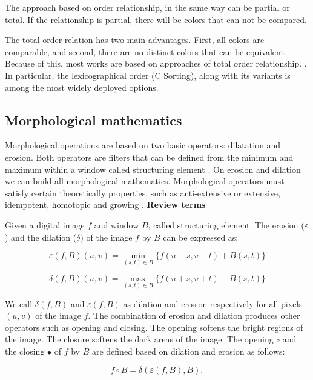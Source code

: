 The approach based on order relationship, in the same way can be partial or total. If the relationship is partial, there will be colors that can not be compared. 

The total order relation has two main advantages. First, all colors are comparable, and second, there are no distinct colors that can be equivalent. Because of this, most works are based on approaches of total order relationship. \cite{aptoula2007comparative}. In particular, the lexicographical order (C Sorting), along with its variants is among the most widely deployed options.  

\subsection{Morphological mathematics}

Morphological operations are based on two basic operators: dilatation and erosion. Both operators are filters that can be defined from the minimum and maximum within a window called structuring element \cite{serra1986introduction}. On erosion and dilation we can build all morphological mathematics. Morphological operators must satisfy certain theoretically properties, such as anti-extensive or extensive, idempotent, homotopic and growing \cite{serra1986introduction}. \textbf{Review terms} %

Given a digital image $f$ and window $B$, called structuring element. The erosion ($\varepsilon$) and the dilation ($\delta$) of the image $f$ by $B$ can be expressed as:

\begin{equation}
\varepsilon(f,B)(u,v)  = \min_{(s,t) \in B} \{f(u-s,v-t) + B(s,t) \}
\end{equation}

\begin{equation}
\delta(f,B)(u,v)  =  \max_{(s,t) \in B} \{f(u+s,v+t) - B(s,t) \}
\end{equation}

We call $\delta(f,B)$ and $\varepsilon(f,B)$ as dilation and erosion respectively for all pixels $(u,v)$ of the image $f$. The combination of erosion and dilation produces other operators such as opening and closing. The opening softens the bright regions of the image. The closure softens the dark areas of the image. The opening $\circ$ and the closing $\bullet$ of $f$ by $B$ are defined based on dilation and erosion as follows:

\begin{equation}
f\circ B = \delta(\varepsilon(f,B),B),
\end{equation}


